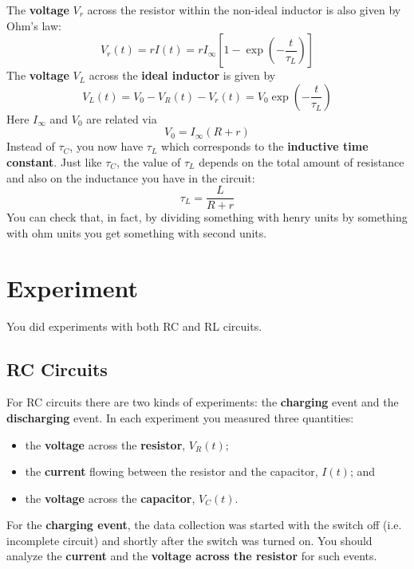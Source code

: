 The \textbf{voltage} $V_{r}$ across the resistor within the non-ideal inductor is also given by Ohm's law:
\begin{equation}
    V_{r}(t) = r I(t) = r I_{\infty} \left[ 1 - \exp\left(- \frac{t}{\tau_{L}}\right) \right]
    \label{eq.05.RL.vr}
\end{equation}
The \textbf{voltage} $V_{L}$ across the \textbf{ideal inductor} is given by
\begin{equation}
    V_{L}(t) = V_{0} - V_{R}(t) - V_{r}(t) = V_{0} \exp\left(- \frac{t}{\tau_{L}}\right)
    \label{eq.05.RL.vL}
\end{equation}
Here $I_{\infty}$ and $V_{0}$ are related via
\begin{equation}
    V_{0} = I_{\infty} \left(R + r\right)
\end{equation}
Instead of $\tau_{C}$, you now have $\tau_{L}$ which corresponds to the \textbf{inductive time constant}. Just like $\tau_{C}$, the value of $\tau_{L}$ depends on the total amount of resistance and also on the inductance you have in the circuit:
\begin{equation}
    \tau_{L} = \frac{L}{R + r}
    \label{eq.05.tauL}
\end{equation}
You can check that, in fact, by dividing something with henry units by something with ohm units you get something with second units.
\section{Experiment}
You did experiments with both RC and RL circuits.
\subsection{RC Circuits}
For RC circuits there are two kinds of experiments: the \textbf{charging} event and the \textbf{discharging} event. In each experiment you measured three quantities:
\begin{itemize}
    \item the \textbf{voltage} across the \textbf{resistor}, $V_{R}(t)$;
    \item the \textbf{current} flowing between the resistor and the capacitor, $I(t)$; and
    \item the \textbf{voltage} across the \textbf{capacitor}, $V_{C}(t)$.
\end{itemize}
For the \textbf{charging event}, the data collection was started with the switch off (i.e. incomplete circuit) and shortly after the switch was turned on. You should analyze the \textbf{current} and the \textbf{voltage across the resistor} for such events.

